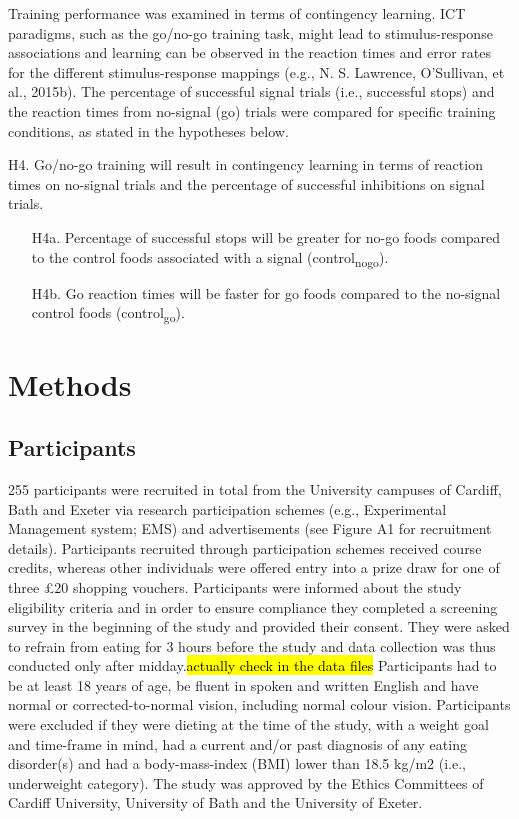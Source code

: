 \documentclass[man,floatsintext]{apa6}
\begin{document}
Training performance was examined in terms of contingency learning. ICT paradigms, such as the go/no-go training task, might lead to stimulus-response associations and learning can be observed in the reaction times and error rates for the different stimulus-response mappings (e.g., N. S. Lawrence, O'Sullivan, et al., 2015b). The percentage of successful signal trials (i.e., successful stops) and the reaction times from no-signal (go) trials were compared for specific training conditions, as stated in the hypotheses below.

\noindent H4. Go/no-go training will result in contingency learning in terms of reaction times on no-signal trials and the percentage of successful inhibitions on signal trials.

\begin{itemize}
\item[H4a.] Percentage of successful stops will be greater for no-go foods compared to the control foods associated with a signal (control\textsubscript{nogo}).
\item[H4b.] Go reaction times will be faster for go foods compared to the no-signal control foods (control\textsubscript{go}).
\end{itemize}

\hypertarget{methods}{%
\section{Methods}\label{methods}}

\hypertarget{participants}{%
\subsection{Participants}\label{participants}}

\par

255 participants were recruited in total from the University campuses of Cardiff, Bath and Exeter via research participation schemes (e.g., Experimental Management system; EMS) and advertisements (see Figure A1 for recruitment details). Participants recruited through participation schemes received course credits, whereas other individuals were offered entry into a prize draw for one of three £20 shopping vouchers. Participants were informed about the study eligibility criteria and in order to ensure compliance they completed a screening survey in the beginning of the study and provided their consent. They were asked to refrain from eating for 3 hours before the study and data collection was thus conducted only after midday.\hl{actually check in the data files} Participants had to be at least 18 years of age, be fluent in spoken and written English and have normal or corrected-to-normal vision, including normal colour vision. Participants were excluded if they were dieting at the time of the study, with a weight goal and time-frame in mind, had a current and/or past diagnosis of any eating disorder(s) and had a body-mass-index (BMI) lower than 18.5 kg/m2 (i.e., underweight category). The study was approved by the Ethics Committees of Cardiff University, University of Bath and the University of Exeter.
\end{document}
